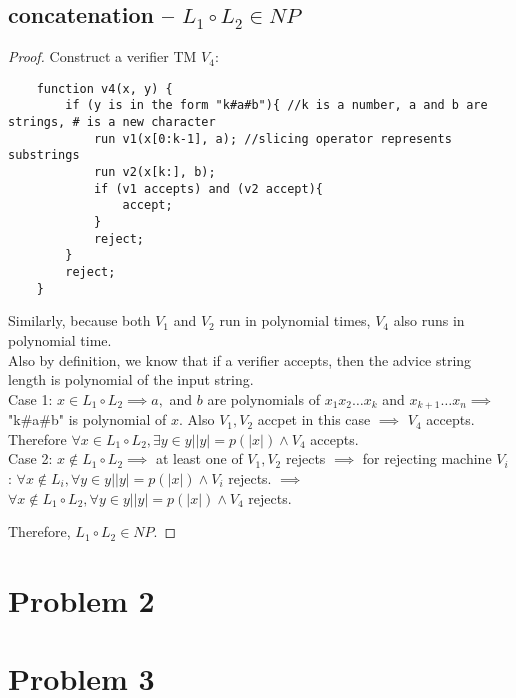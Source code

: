 \documentclass[letterpaper]{article}
\begin{document}
\subsection*{concatenation -- $L_1 \circ L_2 \in NP$}
\begin{proof}
Construct a verifier TM $V_4$:
\begin{verbatim}
    function v4(x, y) {
        if (y is in the form "k#a#b"){ //k is a number, a and b are strings, # is a new character
            run v1(x[0:k-1], a); //slicing operator represents substrings
            run v2(x[k:], b);
            if (v1 accepts) and (v2 accept){
                accept;
            }
            reject;
        }
        reject;
    }
\end{verbatim}

Similarly, because both $V_1$ and $V_2$ run in polynomial times, $V_4$ also runs in polynomial time.\\

Also by definition, we know that if a verifier accepts, then the advice string length is polynomial of the input string.\\

Case 1: $x\in L_1 \circ L_2 \implies a,$ and $b$ are polynomials of $x_1x_2\dots x_k$ and $x_{k+1}\dots x_n \implies$ "k\#a\#b" is polynomial of $x$.
Also $V_1, V_2$ accpet in this case $\implies$ $V_4$ accepts. Therefore $\forall x \in L_1 \circ L_2, \exists y \in {y||y|=p(|x|)} \land V_4$ accepts.\\
Case 2: $x\notin L_1 \circ L_2 \implies $ at least one of $V_1, V_2$ rejects $\implies$ for rejecting machine $V_i$: $\forall x\notin L_i, \forall y \in {y||y|=p(|x|)} \land V_i$ rejects.
$\implies$ $\forall x\notin L_1 \circ L_2, \forall y \in {y||y|=p(|x|)} \land V_4$ rejects.

Therefore, $L_1 \circ L_2 \in NP$.
\end{proof}

\section*{Problem 2}



\section*{Problem 3}
\end{document}

